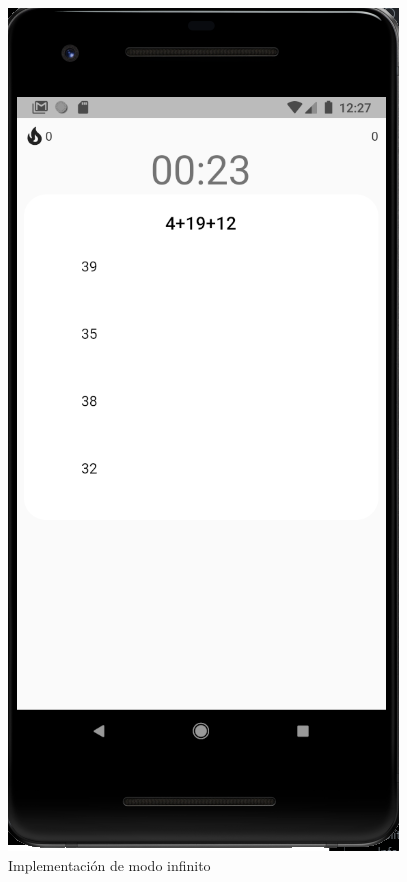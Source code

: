 \documentclass{article}
\begin{document}
\begin{figure}[H]
    \centering
    \includegraphics[scale=0.8]{imgs/Imp/Endless}
    \caption{Implementación de modo infinito}
\end{figure}
\end{document}
